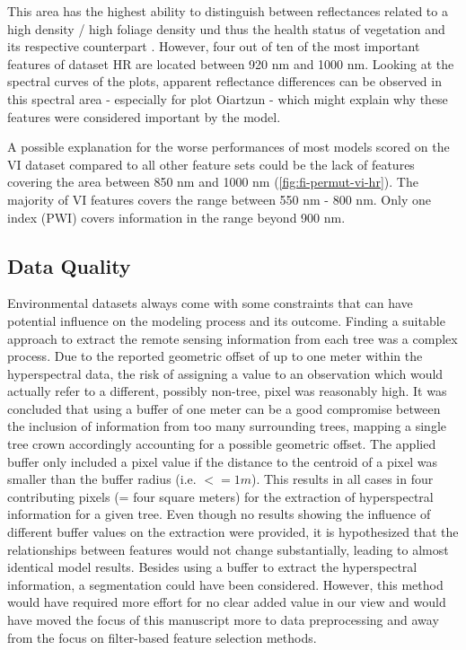 \documentclass[remotesensing,article,submit,moreauthors,pdftex]{Definitions/mdpi}
\begin{document}
This area has the highest ability to distinguish between reflectances related to a high density / high foliage density und thus the health status of vegetation and its respective counterpart \cite{horler1983}.
However, four out of ten of the most important features of dataset HR are located between 920 nm and 1000 nm.
Looking at the spectral curves of the plots, apparent reflectance differences can be observed in this spectral area - especially for plot Oiartzun - which might explain why these features were considered important by the model.

A possible explanation for the worse performances of most models scored on the VI dataset compared to all other feature sets could be the lack of features covering the area between 850 nm and 1000 nm (\autoref{fig:fi-permut-vi-hr}).
The majority of VI features covers the range between 550 nm - 800 nm.
Only one index (PWI) covers information in the range beyond 900 nm.

\subsection{Data Quality}
\label{subsec:data-quality}

Environmental datasets always come with some constraints that can have potential influence on the modeling process and its outcome.
Finding a suitable approach to extract the remote sensing information from each tree was a complex process.
Due to the reported geometric offset of up to one meter within the hyperspectral data, the risk of assigning a value to an observation which would actually refer to a different, possibly non-tree, pixel was reasonably high.
It was concluded that using a buffer of one meter can be a good compromise between the inclusion of information from too many surrounding trees, mapping a single tree crown accordingly accounting for a possible geometric offset.
The applied buffer only included a pixel value if the distance to the centroid of a pixel was smaller than the buffer radius (i.e. $<= 1m$).
This results in all cases in four contributing pixels (= four square meters) for the extraction of hyperspectral information for a given tree.
Even though no results showing the influence of different buffer values on the extraction were provided, it is hypothesized that the relationships between features would not change substantially, leading to almost identical model results.
Besides using a buffer to extract the hyperspectral information, a segmentation could have been considered.
However, this method would have required more effort for no clear added value in our view and would have moved the focus of this manuscript more to data preprocessing and away from the focus on filter-based feature selection methods.
\end{document}
